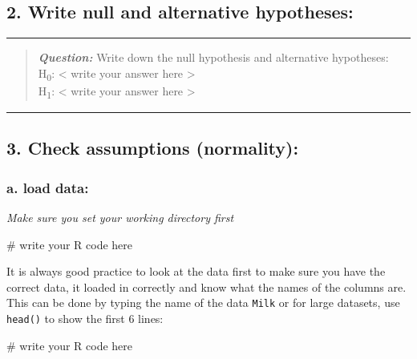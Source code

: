 \documentclass[
  10pt,
  letterpaper,
  DIV=11,
  numbers=noendperiod]{scrartcl}
\newenvironment{Shaded}{\begin{snugshade}}{\end{snugshade}}
\newcommand{\CommentTok}[1]{\textcolor[rgb]{0.37,0.37,0.37}{#1}}
\begin{document}
\hypertarget{write-null-and-alternative-hypotheses}{%
\subsection{2. Write null and alternative
hypotheses:}\label{write-null-and-alternative-hypotheses}}

\begin{center}\rule{0.5\linewidth}{0.5pt}\end{center}

\begin{quote}
\textbf{\emph{Question:}} Write down the null hypothesis and alternative
hypotheses:\\
H\textsubscript{0}: \textless{} write your answer here \textgreater{}\\
H\textsubscript{1}: \textless{} write your answer here \textgreater{}
\end{quote}

\begin{center}\rule{0.5\linewidth}{0.5pt}\end{center}

\hypertarget{check-assumptions-normality}{%
\subsection{3. Check assumptions
(normality):}\label{check-assumptions-normality}}

\hypertarget{a.-load-data}{%
\subsubsection{a. load data:}\label{a.-load-data}}

\emph{Make sure you set your working directory first}

\begin{Shaded}
\begin{Highlighting}[]
\CommentTok{\# write your R code here}
\end{Highlighting}
\end{Shaded}

It is always good practice to look at the data first to make sure you
have the correct data, it loaded in correctly and know what the names of
the columns are. This can be done by typing the name of the data
\texttt{Milk} or for large datasets, use \texttt{head()} to show the
first 6 lines:

\begin{Shaded}
\begin{Highlighting}[]
\CommentTok{\# write your R code here}
\end{Highlighting}
\end{Shaded}
\end{document}
